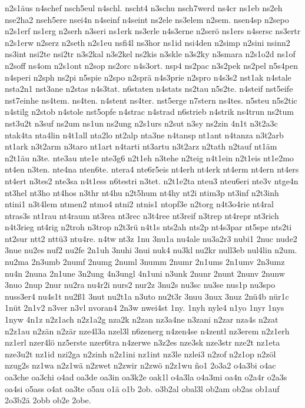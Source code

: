 {n2s1äus
n4schef
nsch5eul
n4schl.
nscht4
n3schu
nsch7werd
ns4cr
ns1eb
ns2eh
nse2ha2
nseh5ere
nsei4n
n4seinf
n4seint
ns2ele
ns3elem
n2sem.
nsen4sp
n2sepo
n2s1erf
ns1erg
n2serh
n3seri
ns1erk
ns3erle
n4s3erne
n2serö
ns1ers
n4sersc
ns3ertr
n2s1erw
n2serz
n2seth
n2s1eu
nsfi4l
ns3hor
ns1id
nsi4den
n2simp
n2sini
nsinn2
ns3int
nsi2te
nsi2tr
n3s2kal
n3s2kel
ns2kis
n3skle
n3s2ky
n3smara
n2s1o2d
ns1of
n2soff
ns4om
n2s1ont
n2sop
ns2orc
n4s3ort.
nsp4
ns2pac
n3s2pek
ns2pel
n5s4pen
n4speri
n2sph
ns2pi
n5spie
n2spo
n2sprä
n4s3prie
n2spro
n4s3s2
nst1ak
n4stale
nsta2n1
nst3ane
n2stas
n4s3tat.
n6staten
n4stats
ns2tau
n5s2te.
n4steif
nst5eife
nst7einhe
ns4tem.
ns4ten.
n4stent
ns4ter.
nst5erge
n7stern
ns4tes.
n5steu
n5s2tic
n4stilg
n2stob
n4stole
nst5opfe
n4strac
n4strad
n6strieb
n4strik
ns4trun
ns2tum
nst3u2t
n3suf
ns2um
ns1un
ns2ung
n2s1urs
n2sut
n3sy
ns2zin
4n1t
n3t2a3c
ntak4ta
nta4lin
n4t1all
nta2lo
nt2alp
nta3ne
n4tansp
nt1ant
n4tanza
n3t2arb
nt1ark
n3t2arm
n3taro
nt1art
n4tarti
nt3artu
n3t2arz
n2tath
n2tauf
nt1äm
n2t1äu
n3te.
nte3au
nte1e
nte3g6
n2t1eh
n3tehe
n2teig
n4t1ein
n2t1eis
nt1e2mo
nt4en
n3ten.
nte4na
nten6te.
ntera4
nte6r5eis
nt4erh
nt4erk
nt4erm
nt4ern
nt4ers
nt4ert
n3tes2
nte3sa
n4t1ess
n6testri
n3tet.
n2t1e2ta
nteu3
nteu6eri
nte3v
ntge4n
nt3hel
nt3ho
nt4hos
n3thr
nt4hu
n2t5hum
nt4hy
nt2i
ntim3p
nt3inf
n2t3inh
ntini1
n3t4lem
ntmen2
ntmo4
ntni2
ntnis1
ntopf3e
n2torg
n4t3o4rie
nt4ral
ntras3s
nt1rau
nt4raum
nt3rea
nt3rec
n3t4ree
nt3reif
n3trep
nt4repr
nt3rich
n4t3rieg
nt4rig
n2troh
n3trop
n2t3rü
n4t1s
nts2ah
nts2p
nt4s3par
nt5spe
nts2ti
nt2sur
ntt2
nttü3
ntu4re.
n4tw
nt3z
1nu
3nu1a
nu4ale
nu3a2r3
nubi1
2nuc
nude2
3nue
nu2es
nuf2
nu2fe
2n1uh
3nuhi
3nui
nuk4
nu3kl
nu2kr
null3eb
nul4lin
n2um.
nu2ma
2n3umb
2numf
2numg
2numl
3numm
2numr
2n1ums
2n1umv
2n3umz
nu4n
2nuna
2n1une
3n2ung
4n3ungl
4n1uni
n3unk
2nunr
2nunt
2nunv
2nunw
3nuo
2nup
2nur
nu2ra
nu4r2i
nurs2
nur2z
3nu2s
nu3sc
nu3se
nus1p
nu3spo
nuss3er4
nu4s1t
nu2ß1
3nut
nu2t1a
n3uto
nu2t3r
3nuu
3nux
3nuz
2nü4b
nür1c
1nüt
2n1v2
n3ver
n3vl
nvoran4
2n3w
nwei4st
1ny.
1nyh
nyle4
n1yo
1nyr
1nys
1nyw
4n1z
n2z1ach
n2z1a2g
nza2k
n2zan
nz3a4ne
n3zani
n2zar
nza4s
n2zat
n2z1au
n2zän
n2zär
nze4l3a
nzel3l
n6zenerg
n4zen4se
n4zentl
nz3erem
n2z1erh
nz1erl
nzer4lö
nz5erste
nzer6tra
n4zerwe
n3z2es
nze3sk
nze3str
nze2t
nz1eta
nze3u2t
nz1id
nzi2ga
n2zinh
n2z1ini
nz1int
nz3le
nzlei3
n2zof
n2z1op
n2zöl
nzug2s
nz1wa
n2z1wä
n2zwet
n2zwir
n2zwö
n2z1wu
ño1
2o3a2
o4a3bi
o4ac
oa3che
oa3chi
o4ad
oa3de
oa3in
oa3k2e
oak1l
o4a3la
o4a3mi
oa4n
o2a4r
o2a3s
oa4si
o5ass
o4at
oa3te
o5au
o1ä
o1b
2ob.
o3b2al
obal3l
ob2am
ob2as
ob1auf
2o3b2ä
2obb
ob2e
2obe.
}
